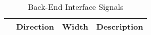 \begin{table}[H]
  \centering
  \begin{tabular}{|l|c|c|p{9.7cm}|}

    \hline
    \rowcolor{iob-green}
    \multicolumn{1}{|c|}{\bf Name} & \multicolumn{1}{c|}{\bf Direction} & \multicolumn{1}{c|}{\bf Width} & \multicolumn{1}{c|}{\bf Description}  \\ \hline \hline

   

  \end{tabular}
  \caption{Back-End Interface Signals}
  \label{tab:if_be}
\end{table}
